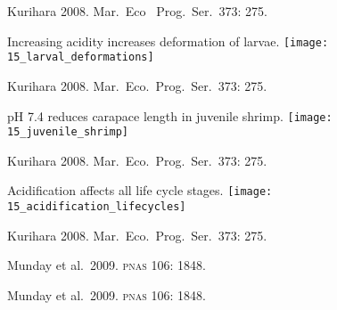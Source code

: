 \documentclass[t]{beamer}
\begin{document}
%
{
\begin{frame}[b]

\hfill \tiny {}
\end{frame}
}

%

{
\begin{frame}[b]

\hfill \tiny Kurihara 2008. Mar.~Eco~ Prog.~Ser.~373: 275.  

\end{frame}
}
%
\begin{frame}{Increasing acidity increases deformation of larvae.}
\texttt{[image: 15\_larval\_deformations]}

\vfilll

\hfill \tiny Kurihara 2008. Mar.~Eco.~Prog.~Ser.~373: 275. 
\end{frame}
%
\begin{frame}{pH 7.4 reduces carapace length in juvenile shrimp.}
\texttt{[image: 15\_juvenile\_shrimp]}

\vfilll

\hfill \tiny Kurihara 2008. Mar.~Eco.~Prog.~Ser.~373: 275. 
\end{frame}
%
\begin{frame}{Acidification affects all life cycle stages.}
\texttt{[image: 15\_acidification\_lifecycles]}

\vfilll

\hfill \tiny Kurihara 2008. Mar.~Eco.~Prog.~Ser.~373: 275. 
\end{frame}
%
{
\begin{frame}[b]

\hfill \tiny {}
\end{frame}
}

%

{
\begin{frame}[b]

\hfill \tiny Munday et al.~2009. \textsc{pnas} 106: 1848.  

\end{frame}
}

%

{
\begin{frame}[b]

\hfill \tiny Munday et al.~2009. \textsc{pnas} 106: 1848.  

\end{frame}
}

%
\end{document}
